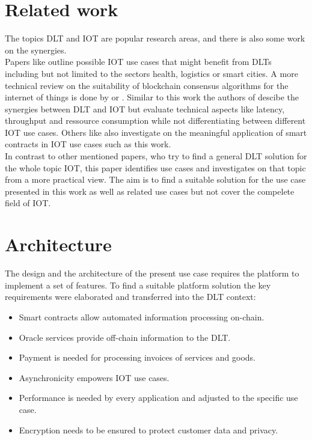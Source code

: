 \documentclass[conference]{IEEEtran}
\begin{document}
\section{Related work}
The topics DLT and IOT are popular research areas, and there is also some work on the synergies.\\
Papers like \cite{Review2018} outline possible IOT use cases that might benefit from DLTs including but not limited to the sectors health, logistics or smart cities. A more technical review on the suitability of blockchain consensus algorithms for the internet of things is done by \cite{Salimitari2018ASO} or \cite{Eval2018}. Similar to this work the authors of \cite{convergence2019} descibe the synergies between DLT and IOT but evaluate technical aspects like latency, throughput and ressource consumption while not differentiating between different IOT use cases. Others like \cite{SCIOT2016} also investigate on the meaningful application of smart contracts in IOT use cases such as this work.\\
In contrast to other mentioned papers, who try to find a general DLT solution for the whole topic IOT, this paper identifies use cases and investigates on that topic from a more practical view. The aim is to find a suitable solution for the use case presented in this work as well as related use cases but not cover the compelete field of IOT.

\section{Architecture}
The design and the architecture of the present use case requires the platform to implement a set of features. To find a suitable platform solution the key requirements were elaborated and transferred into the DLT context:\\

\begin{itemize}
  \item Smart contracts allow automated information processing on-chain.
  \item Oracle services provide off-chain information to the DLT.
  \item Payment is needed for processing invoices of services and goods.
  \item Asynchronicity empowers IOT use cases.
  \item Performance is needed by every application and adjusted to the specific use case.
  \item Encryption needs to be ensured to protect customer data and privacy.
\end{itemize}
\end{document}
